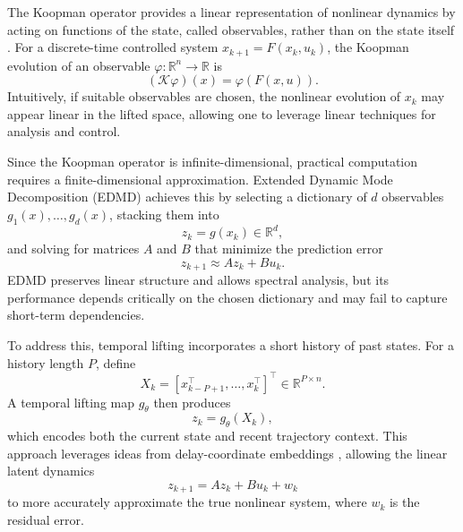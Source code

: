 \documentclass[journal]{IEEEtran}
\begin{document}
The Koopman operator provides a linear representation of nonlinear dynamics by acting on functions of the state, called observables, rather than on the state itself \cite{koopman1931hamiltonian, mezic2005spectral, rowley2009spectral, brunton2022modern}. For a discrete-time controlled system $x_{k+1} = F(x_k,u_k)$, the Koopman evolution of an observable $\varphi:\mathbb{R}^n\to\mathbb{R}$ is
\begin{equation}
    (\mathcal{K}\varphi)(x) = \varphi(F(x,u)).
    \label{eq:koopman_operator}
\end{equation}
Intuitively, if suitable observables are chosen, the nonlinear evolution of $x_k$ may appear linear in the lifted space, allowing one to leverage linear techniques for analysis and control.

Since the Koopman operator is infinite-dimensional, practical computation requires a finite-dimensional approximation. Extended Dynamic Mode Decomposition (EDMD) achieves this by selecting a dictionary of $d$ observables $g_1(x),\ldots,g_d(x)$, stacking them into
\begin{equation}
    z_k = g(x_k) \in \mathbb{R}^d,
    \label{eq:instantaneous_lifting}
\end{equation}
and solving for matrices $A$ and $B$ that minimize the prediction error
\begin{equation}
    z_{k+1} \approx A z_k + B u_k.
    \label{eq:learned_dynamics}
\end{equation}
EDMD preserves linear structure and allows spectral analysis, but its performance depends critically on the chosen dictionary and may fail to capture short-term dependencies.

To address this, temporal lifting incorporates a short history of past states. For a history length $P$, define
\begin{equation}
    X_k = [x_{k-P+1}^\top, \ldots, x_k^\top]^\top \in \mathbb{R}^{P\times n}.
    \label{eq:history_window}
\end{equation}
A temporal lifting map $g_\theta$ then produces
\begin{equation}
    z_k = g_\theta(X_k),
    \label{eq:temporal_lifting}
\end{equation}
which encodes both the current state and recent trajectory context. This approach leverages ideas from delay-coordinate embeddings \cite{arbabi2017ergodic, rank2019recurrent}, allowing the linear latent dynamics
\begin{equation}
    z_{k+1} = A z_k + B u_k + w_k
\end{equation}
to more accurately approximate the true nonlinear system, where $w_k$ is the residual error.
\end{document}
